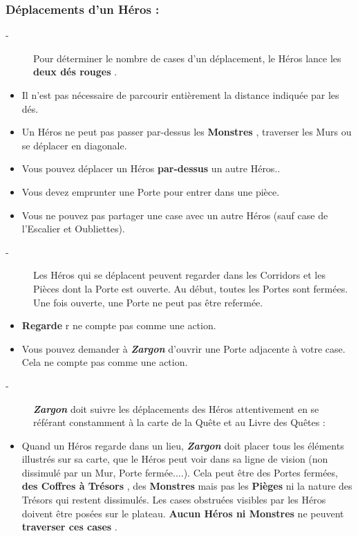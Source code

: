 \documentclass{scrartcl}%
\begin{document}
\subsubsection{ Déplacements d'un Héros :
}%
\label{ssubsec:DplacementsdunHros}%
\begin{description}%
\item[{-} ]%
%
 Pour déterminer le nombre de cases d'un déplacement, le Héros lance les %
\textbf{deux dés rouges}%
.
%
\end{description}%
\begin{itemize}%
\item%
%
 Il n'est pas nécessaire de parcourir entièrement la distance indiquée par les dés.
%
\item%
%
 Un Héros ne peut pas passer par{-}dessus les %
\textbf{Monstres}%
, traverser les Murs ou se déplacer en diagonale.
%
\item%
%
 Vous pouvez déplacer un Héros %
\textbf{par{-}dessus}%
\textit{ }%
 un autre Héros..
%
\item%
%
 Vous devez emprunter une Porte pour entrer dans une pièce.
%
\item%
%
 Vous ne pouvez pas partager une case avec un autre Héros (sauf case de l'Escalier et Oubliettes).
%
\end{itemize}%
\begin{description}%
\item[{-} ]%
%
 Les Héros qui se déplacent peuvent regarder dans les Corridors et les Pièces dont la Porte est ouverte. Au début, toutes les Portes sont fermées. Une fois ouverte, une Porte ne peut pas être refermée.
%
\end{description}%
\begin{itemize}%
\item%
%
\textbf{Regarde}%
r ne compte pas comme une action.
%
\item%
%
 Vous pouvez demander à %
\textbf{\textit{Zargon}}%
\textit{ }%
 d'ouvrir une Porte adjacente à votre case. Cela ne compte pas comme une action.
%
\end{itemize}%
\begin{description}%
\item[{-} ]%
%
\textbf{\textit{Zargon}}%
\textit{ }%
 doit suivre les déplacements des Héros attentivement en se référant constamment à la carte de la Quête et au Livre des Quêtes :
%
\end{description}%
\begin{itemize}%
\item%
%
 Quand un Héros regarde dans un lieu, %
\textbf{\textit{Zargon}}%
\textit{ }%
 doit placer tous les éléments illustrés sur sa carte, que le Héros peut voir dans sa ligne de vision (non dissimulé par un Mur, Porte fermée....). Cela peut être des Portes fermées, %
\textbf{des Coffres à Trésors}%
, des %
\textbf{Monstres}%
mais pas les%
\textbf{ Pièges}%
\textit{ }%
 ni la nature des Trésors qui restent dissimulés. Les cases obstruées visibles par les Héros doivent être posées sur le plateau. %
\textbf{Aucun Héros ni Monstres}%
\textit{ }%
 ne peuvent %
\textbf{traverser ces cases}%
.
%
\end{itemize}
\end{document}
